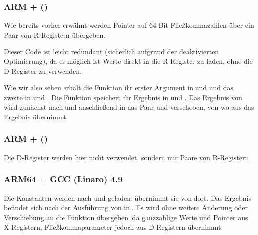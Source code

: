 \subsubsection{ARM + \NonOptimizingXcodeIV (\ThumbTwoMode)}
\label{FPU_passing_floats_ARM}


Wie bereits vorher erwähnt werden Pointer auf 64-Bit-Fließkommazahlen über ein
Paar von R-Registern übergeben.

Dieser Code ist leicht redundant (sicherlich aufgrund der deaktivierten
Optimierung), da es möglich ist Werte direkt in die R-Register zu laden, ohne
die D-Register zu verwenden.

Wie wir also sehen erhält die  Funktion ihr erster Argument in
 und  und das zweite in  und . Die Funktion
speichert ihr Ergebnis in  und . 
Das Ergebnis von  wird zunächst nach  und
anschließend in das Paar  und  verschoben, von wo aus \printf das
Ergebnis übernimmt. 

\subsubsection{ARM + \NonOptimizingKeilVI (\ARMMode)}



Die D-Register werden hier nicht verwendet, sondern nur Paare von R-Registern.

\subsubsection{ARM64 + \Optimizing GCC (Linaro) 4.9}



Die Konstanten werden nach  und  geladen:  übernimmt
sie von dort. Das Ergebnis befindet sich nach der Ausführung von  in
. 
Es wird ohne weitere Änderung oder Verschiebung an die Funktion \printf
übergeben, da \printf ganzzahlige Werte und Pointer aus X-Registern,
Fließkommaparameter jedoch aus D-Registern übernimmt.

